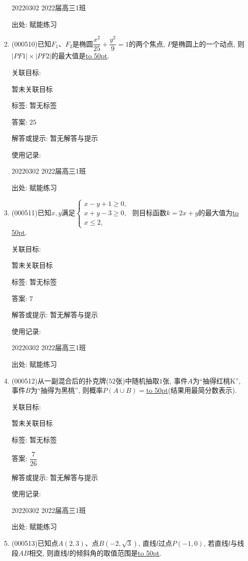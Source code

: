 \documentclass[10pt,a4paper]{article}
\newcommand{\blank}[1]{\underline{\hbox to #1pt{}}}
\begin{document}
\begin{enumerate}[1.]
20220302	2022届高三1班	


出处: 赋能练习
\item { (000510)}已知$F_1$、$F_2$是椭圆$\dfrac{x^2}{25}+\dfrac{y^2}9=1$的两个焦点, $P$是椭圆上的一个动点, 则$|PF1|\times |PF2|$的最大值是\blank{50}.


关联目标:

暂未关联目标



标签: 暂无标签

答案: $25$

解答或提示: 暂无解答与提示

使用记录:

20220302	2022届高三1班	


出处: 赋能练习
\item { (000511)}已知$x, y$满足$\begin{cases}x-y+1 \ge 0, \\ x+y-3 \ge 0, \\  x\le 2, \end{cases}$ 则目标函数$k=2x+y$的最大值为\blank{50}.


关联目标:

暂未关联目标



标签: 暂无标签

答案: $7$

解答或提示: 暂无解答与提示

使用记录:

20220302	2022届高三1班	


出处: 赋能练习
\item { (000512)}从一副混合后的扑克牌($52$张)中随机抽取$1$张, 事件$A$为``抽得红桃K'', 事件$B$为``抽得为黑桃'', 则概率$P(A\cup B)=$\blank{50}(结果用最简分数表示).


关联目标:

暂未关联目标



标签: 暂无标签

答案: $\dfrac 7{26}$

解答或提示: 暂无解答与提示

使用记录:

20220302	2022届高三1班	


出处: 赋能练习
\item { (000513)}已知点$A(2,3)$、点$B(-2,\sqrt3)$, 直线$l$过点$P(-1,0)$, 若直线$l$与线段$AB$相交, 则直线$l$的倾斜角的取值范围是\blank{50}.



\end{enumerate}
\end{document}
